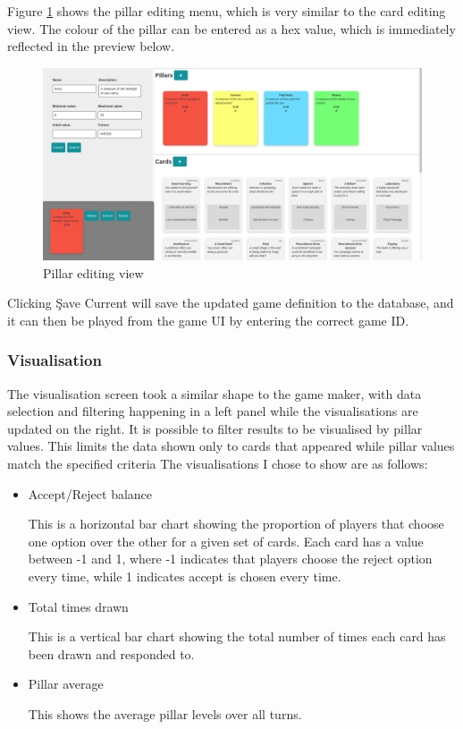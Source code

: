 Figure \ref{fig:pillar_edit} shows the pillar editing menu, which is very similar to the card editing view. The colour of the pillar can be entered as a hex value, which is immediately reflected in the preview below.

\begin{figure}[!h]
	\centering
	\includegraphics[width=1.0\textwidth]{./images/design/pillar_edit.png}
	\caption{Pillar editing view}
	\label{fig:pillar_edit}
\end{figure}

Clicking \c{Save Current} will save the updated game definition to the database, and it can then be played from the game UI by entering the correct game ID.

\subsubsection{Visualisation}

The visualisation screen took a similar shape to the game maker, with data selection and filtering happening in a left panel while the visualisations are updated on the right.
It is possible to filter results to be visualised by pillar values. This limits the data shown only to cards that appeared while pillar values match the specified criteria The visualisations I chose to show are as follows:
\begin{itemize}
	\item Accept/Reject balance

	      This is a horizontal bar chart showing the proportion of players that choose one option over the other for a given set of cards. Each card has a value between -1 and 1, where -1 indicates that players choose the reject option every time, while 1 indicates accept is chosen every time.

	\item Total times drawn

	      This is a vertical bar chart showing the total number of times each card has been drawn and responded to.

	\item Pillar average

	      This shows the average pillar levels over all turns.
\end{itemize}

